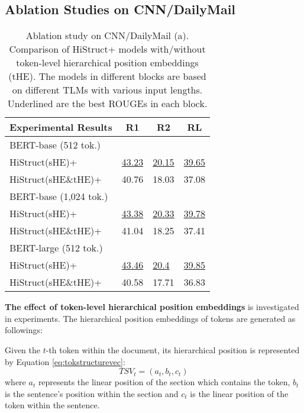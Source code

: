 \documentclass[11pt]{article}
\begin{document}
\subsection{Ablation Studies on CNN/DailyMail}
\label{subsec:Ablation studies on CNN/DailyMail}

\begin{table}[ht]
\fontsize{9}{9}
\selectfont
\centering
\begin{tabular}{@{}llll@{}}
\toprule
Experimental Results  &  \multicolumn{1}{c}{R1} & \multicolumn{1}{c}{R2} & \multicolumn{1}{c}{RL}    \\ \midrule
BERT-base (512 tok.)       \\ \midrule
HiStruct(sHE)+      & \underline{43.23} & \underline{20.15} & \underline{39.65} \\
HiStruct(sHE\&tHE)+ & 40.76 & 18.03 & 37.08 \\ \midrule
BERT-base (1,024 tok.)  & & &        \\ \midrule
HiStruct(sHE)+      & \underline{43.38} & \underline{20.33} & \underline{39.78} \\
HiStruct(sHE\&tHE)+ & 41.04 & 18.25 & 37.41 \\ \midrule
BERT-large (512 tok.) & & &         \\ \midrule
HiStruct(sHE)+      & \underline{43.46} & \underline{20.4}  & \underline{39.85} \\
HiStruct(sHE\&tHE)+ & 40.58 & 17.71 & 36.83 \\ \bottomrule
\end{tabular}
\caption[Ablation study on CNN/DailyMail (a)]{Ablation study on CNN/DailyMail (a). Comparison of HiStruct+ models with/without token-level hierarchical position embeddings (tHE). The models in different blocks are based on different TLMs with various input lengths. Underlined are the best ROUGEs in each block.}
\label{tab:cnndm_ablation_a}
\end{table}

\textbf{The effect of token-level hierarchical position embeddings} is investigated in experiments. The hierarchical position embeddings of tokens are generated as followings: 

Given the $t$-th token within the document, its hierarchical position is represented by Equation \ref{eq:tokstructurevec}:
\begin{equation} \label{eq:tokstructurevec}
TSV_t = (a_t, b_t, c_t)
\end{equation}
where $a_t$ represents the linear position of the section  which contains the token, $b_t$ is the sentence's position within the section and $c_t$ is the linear position of the token within the sentence. 
\end{document}
